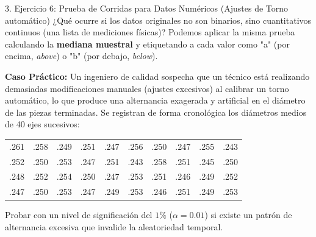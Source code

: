 \documentclass[11pt,a4paper]{article}
\begin{document}
\begin{subsection}{3. Ejercicio 6: Prueba de Corridas para Datos Numéricos (Ajustes de Torno automático)}
    ¿Qué ocurre si los datos originales no son binarios, sino cuantitativos continuos (una lista de mediciones físicas)? Podemos aplicar la misma prueba calculando la \textbf{mediana muestral} y etiquetando a cada valor como "a" (por encima, \textit{above}) o "b" (por debajo, \textit{below}).

    \textbf{Caso Práctico:} Un ingeniero de calidad sospecha que un técnico está realizando demasiadas modificaciones manuales (ajustes excesivos) al calibrar un torno automático, lo que produce una alternancia exagerada y artificial en el diámetro de las piezas terminadas. Se registran de forma cronológica los diámetros medios de 40 ejes sucesivos:
    \begin{table}[h!]
        \centering
        \begin{tabular}{cccccccccc}
            .261 & .258 & .249 & .251 & .247 & .256 & .250 & .247 & .255 & .243 \\
            .252 & .250 & .253 & .247 & .251 & .243 & .258 & .251 & .245 & .250 \\
            .248 & .252 & .254 & .250 & .247 & .253 & .251 & .246 & .249 & .252 \\
            .247 & .250 & .253 & .247 & .249 & .253 & .246 & .251 & .249 & .253 \\
        \end{tabular}
    \end{table}
    Probar con un nivel de significación del $1\%$ ($\alpha = 0.01$) si existe un patrón de alternancia excesiva que invalide la aleatoriedad temporal.


\end{subsection}
\end{document}

